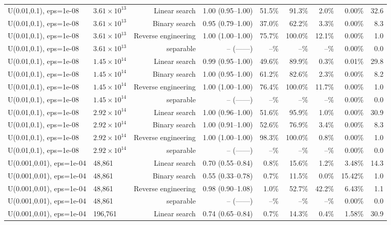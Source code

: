 \begin{tabular}{llrrrrrrr}
U(0.01,0.1), eps=1e-08 & $3.61\times 10^{13}$ & Linear search & 1.00 (0.95--1.00) & 51.5\% & 91.3\% & 2.0\% & 0.00\% & 32.6 \\
U(0.01,0.1), eps=1e-08 & $3.61\times 10^{13}$ & Binary search & 0.95 (0.79--1.00) & 37.0\% & 62.2\% & 3.3\% & 0.00\% & 8.3 \\
U(0.01,0.1), eps=1e-08 & $3.61\times 10^{13}$ & Reverse engineering & 1.00 (1.00--1.00) & 75.7\% & 100.0\% & 12.1\% & 0.00\% & 1.0 \\
U(0.01,0.1), eps=1e-08 & $3.61\times 10^{13}$ & separable & -- (------) & --\% & --\% & --\% & 0.00\% & 0.0 \\
U(0.01,0.1), eps=1e-08 & $1.45\times 10^{14}$ & Linear search & 0.99 (0.95--1.00) & 49.6\% & 89.9\% & 0.3\% & 0.01\% & 29.8 \\
U(0.01,0.1), eps=1e-08 & $1.45\times 10^{14}$ & Binary search & 1.00 (0.95--1.00) & 61.2\% & 82.6\% & 2.3\% & 0.00\% & 8.2 \\
U(0.01,0.1), eps=1e-08 & $1.45\times 10^{14}$ & Reverse engineering & 1.00 (1.00--1.00) & 76.4\% & 100.0\% & 11.7\% & 0.00\% & 1.0 \\
U(0.01,0.1), eps=1e-08 & $1.45\times 10^{14}$ & separable & -- (------) & --\% & --\% & --\% & 0.00\% & 0.0 \\
U(0.01,0.1), eps=1e-08 & $2.92\times 10^{14}$ & Linear search & 1.00 (0.96--1.00) & 51.6\% & 95.9\% & 1.0\% & 0.00\% & 30.9 \\
U(0.01,0.1), eps=1e-08 & $2.92\times 10^{14}$ & Binary search & 1.00 (0.91--1.00) & 52.6\% & 76.9\% & 3.4\% & 0.00\% & 8.3 \\
U(0.01,0.1), eps=1e-08 & $2.92\times 10^{14}$ & Reverse engineering & 1.00 (1.00--1.00) & 98.3\% & 100.0\% & 0.8\% & 0.00\% & 1.0 \\
U(0.01,0.1), eps=1e-08 & $2.92\times 10^{14}$ & separable & -- (------) & --\% & --\% & --\% & 0.00\% & 0.0 \\
U(0.001,0.01), eps=1e-04 & 48,861 & Linear search & 0.70 (0.55--0.84) & 0.8\% & 15.6\% & 1.2\% & 3.48\% & 14.3 \\
U(0.001,0.01), eps=1e-04 & 48,861 & Binary search & 0.55 (0.33--0.78) & 0.7\% & 11.5\% & 0.0\% & 15.42\% & 1.0 \\
U(0.001,0.01), eps=1e-04 & 48,861 & Reverse engineering & 0.98 (0.90--1.08) & 1.0\% & 52.7\% & 42.2\% & 6.43\% & 1.1 \\
U(0.001,0.01), eps=1e-04 & 48,861 & separable & -- (------) & --\% & --\% & --\% & 0.00\% & 0.0 \\
U(0.001,0.01), eps=1e-04 & 196,761 & Linear search & 0.74 (0.65--0.84) & 0.7\% & 14.3\% & 0.4\% & 1.58\% & 30.9 \\

\end{tabular}
